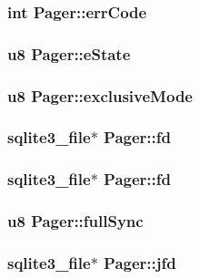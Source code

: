\subsubsection{\setlength{\rightskip}{0pt plus 5cm}int \bf{Pager::err\-Code}}\label{structPager_19647148eb32314eaa97abf7b512b6af}


\subsubsection{\setlength{\rightskip}{0pt plus 5cm}\bf{u8} \bf{Pager::e\-State}}\label{structPager_0ecfd24ae9e300a7636b05680ad5bfe3}


\subsubsection{\setlength{\rightskip}{0pt plus 5cm}\bf{u8} \bf{Pager::exclusive\-Mode}}\label{structPager_935df50d4c73ef7b9c3166397018e236}


\subsubsection{\setlength{\rightskip}{0pt plus 5cm}\bf{sqlite3\_\-file}$\ast$ \bf{Pager::fd}}\label{structPager_f9a4265d38803db5830ebc603fd693e9}


\subsubsection{\setlength{\rightskip}{0pt plus 5cm}\bf{sqlite3\_\-file}$\ast$ \bf{Pager::fd}}\label{structPager_f9a4265d38803db5830ebc603fd693e9}


\subsubsection{\setlength{\rightskip}{0pt plus 5cm}\bf{u8} \bf{Pager::full\-Sync}}\label{structPager_1df9e5a8245518b911d8c6e27bcad070}


\subsubsection{\setlength{\rightskip}{0pt plus 5cm}\bf{sqlite3\_\-file}$\ast$ \bf{Pager::jfd}}\label{structPager_e1b57829dc5dcb7d1ef4e22769e26251}



